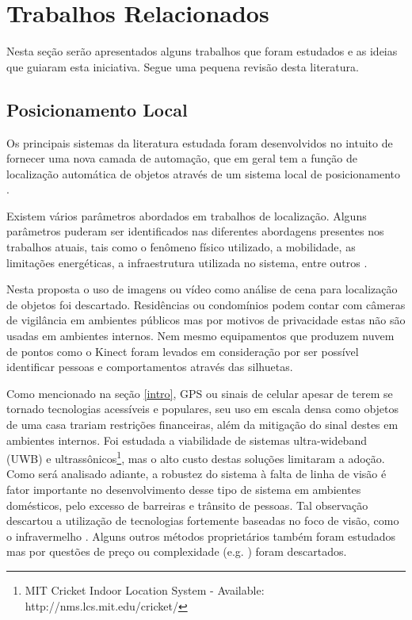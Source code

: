 \section{Trabalhos Relacionados} \label{related}

Nesta seção serão apresentados alguns trabalhos que foram estudados e as ideias que guiaram esta iniciativa. Segue uma pequena revisão desta literatura.

\subsection{Posicionamento Local}

Os principais sistemas da literatura estudada foram desenvolvidos no intuito de fornecer uma nova camada de automação, que em geral tem a função de localização automática de objetos através de um sistema local de posicionamento \cite{Liu2007,Seco2009}.

Existem vários parâmetros abordados em trabalhos de localização. Alguns parâmetros puderam ser identificados nas diferentes abordagens presentes nos trabalhos atuais, tais como o fenômeno físico utilizado, a mobilidade, as limitações energéticas, a infraestrutura utilizada no sistema, entre outros \cite{Hightower2001}.

Nesta proposta o uso de imagens ou vídeo como análise de cena para localização de objetos foi descartado. Residências ou condomínios podem contar com câmeras de vigilância em ambientes públicos mas por motivos de privacidade estas não são usadas em ambientes internos. Nem mesmo equipamentos que produzem nuvem de pontos como o Kinect\textsuperscript{\textregistered} foram levados em consideração por ser possível identificar pessoas e comportamentos através das silhuetas.

Como mencionado na seção \ref{intro}, GPS ou sinais de celular apesar de terem se tornado tecnologias acessíveis e populares, seu uso em escala densa como objetos de uma casa trariam restrições financeiras, além da mitigação do sinal destes em ambientes internos. Foi estudada a viabilidade de sistemas ultra-wideband (UWB) \cite{Fontana2003} e ultrassônicos\footnote{MIT Cricket Indoor Location System - Available: http://nms.lcs.mit.edu/cricket/}, mas o alto custo destas soluções limitaram a adoção. Como será analisado adiante, a robustez do sistema à falta de linha de visão é fator importante no desenvolvimento desse tipo de sistema em ambientes domésticos,  pelo excesso de barreiras e trânsito de pessoas. Tal observação descartou a utilização de tecnologias fortemente baseadas no foco de visão, como o infravermelho \cite{Want1992}. Alguns outros métodos proprietários também foram estudados mas por questões de preço ou complexidade (e.g. \cite{Werb1998}) foram descartados.


